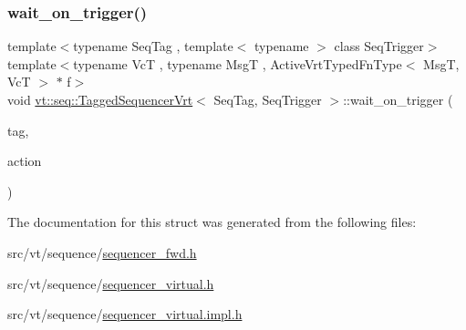 \mbox{\label{structvt_1_1seq_1_1_tagged_sequencer_vrt_a768f8c419f42b3dad84ebce3f046f0e9}} 
\subsubsection{\texorpdfstring{wait\+\_\+on\+\_\+trigger()}{wait\_on\_trigger()}}
{\footnotesize\ttfamily template$<$typename Seq\+Tag , template$<$ typename $>$ class Seq\+Trigger$>$ \\
template$<$typename VcT , typename MsgT , Active\+Vrt\+Typed\+Fn\+Type$<$ Msg\+T, Vc\+T $>$ $\ast$ f$>$ \\
void \hyperlink{structvt_1_1seq_1_1_tagged_sequencer_vrt}{vt\+::seq\+::\+Tagged\+Sequencer\+Vrt}$<$ Seq\+Tag, Seq\+Trigger $>$\+::wait\+\_\+on\+\_\+trigger (\begin{DoxyParamCaption}\item[{\hyperlink{namespacevt_a84ab281dae04a52a4b243d6bf62d0e52}{Tag\+Type} const \&}]{tag,  }\item[{\hyperlink{structvt_1_1seq_1_1_tagged_sequencer_a0210dbd34288d440e0cd51db9d6637bd}{Seq\+Action\+Type}$<$ MsgT, VcT $>$}]{action }\end{DoxyParamCaption})}



The documentation for this struct was generated from the following files\+:\begin{DoxyCompactItemize}
\item 
src/vt/sequence/\hyperlink{sequencer__fwd_8h}{sequencer\+\_\+fwd.\+h}\item 
src/vt/sequence/\hyperlink{sequencer__virtual_8h}{sequencer\+\_\+virtual.\+h}\item 
src/vt/sequence/\hyperlink{sequencer__virtual_8impl_8h}{sequencer\+\_\+virtual.\+impl.\+h}\end{DoxyCompactItemize}
